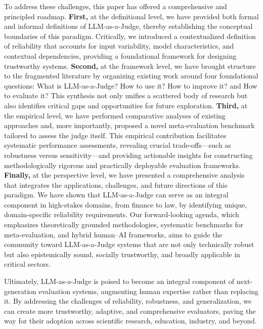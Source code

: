 \documentclass[acmsmall,screen]{acmart}
\begin{document}
To address these challenges, this paper has offered a comprehensive and principled roadmap. \textbf{First,} at the definitional level, we have provided both formal and informal definitions of LLM-as-a-Judge, thereby establishing the conceptual boundaries of this paradigm. Critically, we introduced a contextualized definition of reliability that accounts for input variability, model characteristics, and contextual dependencies, providing a foundational framework for designing trustworthy systems. \textbf{Second,} at the framework level, we have brought structure to the fragmented literature by organizing existing work around four foundational questions: What is LLM-as-a-Judge? How to use it? How to improve it? and How to evaluate it? This synthesis not only unifies a scattered body of research but also identifies critical gaps and opportunities for future exploration. \textbf{Third, }at the empirical level, we have performed comparative analyses of existing approaches and, more importantly, proposed a novel meta-evaluation benchmark tailored to assess the judge itself. This empirical contribution facilitates systematic performance assessments, revealing crucial trade-offs—such as robustness versus sensitivity—and providing actionable insights for constructing methodologically rigorous and practically deployable evaluation frameworks. \textbf{Finally, }at the perspective level, we have presented a comprehensive analysis that integrates the applications, challenges, and future directions of this paradigm. We have shown that LLM-as-a-Judge can serve as an integral component in high-stakes domains, from finance to law, by identifying unique, domain-specific reliability requirements. Our forward-looking agenda, which emphasizes theoretically grounded methodologies, systematic benchmarks for meta-evaluation, and hybrid human–AI frameworks, aims to guide the community toward LLM-as-a-Judge systems that are not only technically robust but also epistemically sound, socially trustworthy, and broadly applicable in critical sectors.

Ultimately, LLM-as-a-Judge is poised to become an integral component of next-generation evaluation systems, augmenting human expertise rather than replacing it. By addressing the challenges of reliability, robustness, and generalization, we can create more trustworthy, adaptive, and comprehensive evaluators, paving the way for their adoption across scientific research, education, industry, and beyond.
\end{document}

